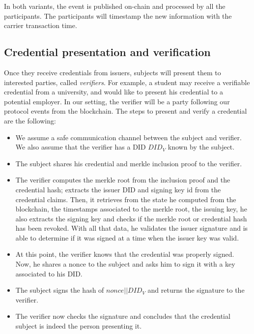 \documentclass[10pt,a4paper]{article}
\begin{document}
In both variants, the event is published on-chain and processed by all the participants. The participants will timestamp the new information with the carrier transaction time.

\subsection{Credential presentation and verification}

Once they receive credentials from issuers, subjects will present them to interested parties, called \emph{verifiers}. For example, a student may receive a verifiable credential from a university, and would like to present his credential to a potential employer. In our setting, the verifier will be a party following our protocol events from the blockchain. The steps to present and verify a credential are the following:
\begin{itemize}
\item We assume a safe communication channel between the subject and verifier. 
      We also assume that the verifier has a DID $DID_{V}$ known by the subject.
\item The subject shares his credential and merkle inclusion proof to the verifier.
\item The verifier computes the merkle root from the inclusion proof and the credential hash; extracts the issuer DID and signing key id from the credential claims. Then, it retrieves from the state he computed from the blockchain, the timestamps associated to the merkle root, the issuing key, he also extracts the signing key and checks if the merkle root or credential hash has been revoked. With all that data, he validates the issuer signature and is able to determine if it was signed at a time when the issuer key was valid.
\item At this point, the verifier knows that the credential was properly signed. Now, he shares a nonce to the subject and asks him to sign it with a key associated to his DID.
\item The subject signs the hash of $nonce || DID_{V}$ and returns the signature to the verifier.
\item The verifier now checks the signature and concludes that the credential subject is indeed the person presenting it.
\end{itemize}

\end{document}
